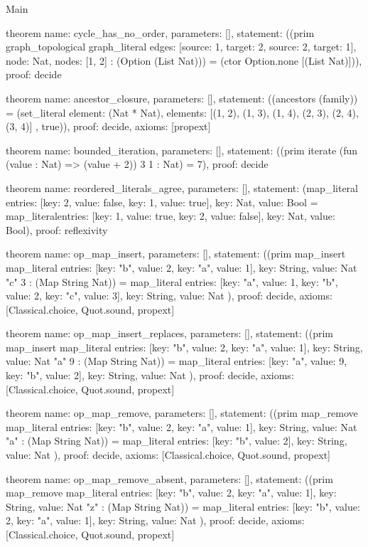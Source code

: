 \begin{lexlean}{Main}
\begin{semanticmodule}
theorem{
  name: cycle_has_no_order,
  parameters: [],
  statement: ((prim graph_topological graph_literal{
    edges: [{source: 1, target: 2}, {source: 2, target: 1}],
    node: Nat,
    nodes: [1, 2]
  } : (Option (List Nat))) = (ctor Option.none [(List Nat)])),
  proof: decide{}
}

theorem{
  name: ancestor_closure,
  parameters: [],
  statement: ((ancestors (family)) = (set_literal{
    element: (Nat * Nat),
    elements: [(1, 2), (1, 3), (1, 4), (2, 3), (2, 4), (3, 4)]
  }, true)),
  proof: decide{},
  axioms: [propext]
}

theorem{
  name: bounded_iteration,
  parameters: [],
  statement: ((prim iterate (fun (value : Nat) => (value + 2)) 3 1 : Nat) = 7),
  proof: decide{}
}

theorem{
  name: reordered_literals_agree,
  parameters: [],
  statement: (map_literal{
    entries: [{key: 2, value: false}, {key: 1, value: true}],
    key: Nat,
    value: Bool
  } = map_literal{entries: [{key: 1, value: true}, {key: 2, value: false}], key: Nat, value: Bool}),
  proof: reflexivity{}
}

theorem{
  name: op_map_insert,
  parameters: [],
  statement: ((prim map_insert map_literal{
    entries: [{key: "b", value: 2}, {key: "a", value: 1}],
    key: String,
    value: Nat
  } "c" 3 : (Map String Nat)) = map_literal{
    entries: [{key: "a", value: 1}, {key: "b", value: 2}, {key: "c", value: 3}],
    key: String,
    value: Nat
  }),
  proof: decide{},
  axioms: [Classical.choice, Quot.sound, propext]
}

theorem{
  name: op_map_insert_replaces,
  parameters: [],
  statement: ((prim map_insert map_literal{
    entries: [{key: "b", value: 2}, {key: "a", value: 1}],
    key: String,
    value: Nat
  } "a" 9 : (Map String Nat)) = map_literal{
    entries: [{key: "a", value: 9}, {key: "b", value: 2}],
    key: String,
    value: Nat
  }),
  proof: decide{},
  axioms: [Classical.choice, Quot.sound, propext]
}

theorem{
  name: op_map_remove,
  parameters: [],
  statement: ((prim map_remove map_literal{
    entries: [{key: "b", value: 2}, {key: "a", value: 1}],
    key: String,
    value: Nat
  } "a" : (Map String Nat)) = map_literal{
    entries: [{key: "b", value: 2}],
    key: String,
    value: Nat
  }),
  proof: decide{},
  axioms: [Classical.choice, Quot.sound, propext]
}

theorem{
  name: op_map_remove_absent,
  parameters: [],
  statement: ((prim map_remove map_literal{
    entries: [{key: "b", value: 2}, {key: "a", value: 1}],
    key: String,
    value: Nat
  } "z" : (Map String Nat)) = map_literal{
    entries: [{key: "b", value: 2}, {key: "a", value: 1}],
    key: String,
    value: Nat
  }),
  proof: decide{},
  axioms: [Classical.choice, Quot.sound, propext]
}


\end{semanticmodule}
\end{lexlean}
